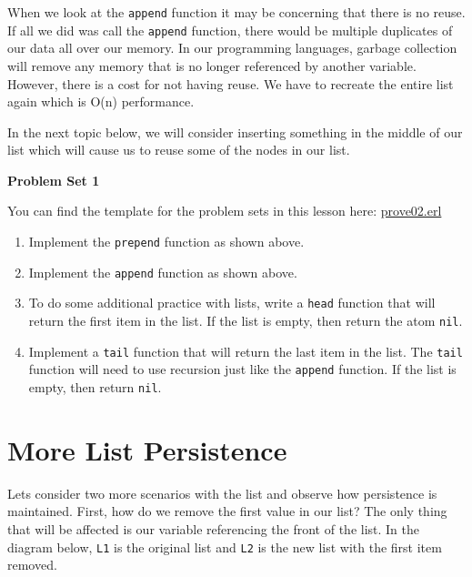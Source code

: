 \documentclass[
]{book}
\providecommand{\tightlist}{%
  \setlength{\itemsep}{0pt}\setlength{\parskip}{0pt}}
\begin{document}
When we look at the \texttt{append} function it may be concerning that there is no reuse. If all we did was call the \texttt{append} function, there would be multiple duplicates of our data all over our memory. In our programming languages, garbage collection will remove any memory that is no longer referenced by another variable. However, there is a cost for not having reuse. We have to recreate the entire list again which is O(n) performance.

In the next topic below, we will consider inserting something in the middle of our list which will cause us to reuse some of the nodes in our list.

\begin{problembox}

\textbf{Problem Set 1}

You can find the template for the problem sets in this lesson here: \href{proves/prove02.erl}{prove02.erl}

\begin{enumerate}
\def\labelenumi{\arabic{enumi}.}
\tightlist
\item
  Implement the \texttt{prepend} function as shown above.
\item
  Implement the \texttt{append} function as shown above.
\item
  To do some additional practice with lists, write a \texttt{head} function that will return the first item in the list. If the list is empty, then return the atom \texttt{nil}.
\item
  Implement a \texttt{tail} function that will return the last item in the list. The \texttt{tail} function will need to use recursion just like the \texttt{append} function. If the list is empty, then return \texttt{nil}.
\end{enumerate}

\end{problembox}

\hypertarget{more-list-persistence}{%
\section{More List Persistence}\label{more-list-persistence}}

Lets consider two more scenarios with the list and observe how persistence is maintained. First, how do we remove the first value in our list? The only thing that will be affected is our variable referencing the front of the list. In the diagram below, \texttt{L1} is the original list and \texttt{L2} is the new list with the first item removed.
\end{document}
